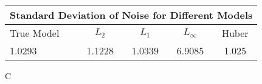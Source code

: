 \begin{tabular}{l|cccc} \hline \hline 
\multicolumn{5}{c}{Standard Deviation of Noise for Different Models} \\ \hline \hline
True Model & $L_2$ & $L_1$ & $L_\infty$ & Huber \\ \hline 
1.0293 & 1.1228 & 1.0339 & 6.9085 & 1.025  \\ 
\hline 
\end{tabular}C